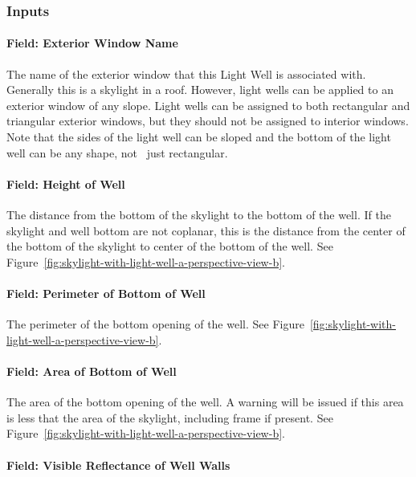 \subsubsection{Inputs}\label{inputs-8-004}

\paragraph{Field: Exterior Window Name}\label{field-exterior-window-name}

The name of the exterior window that this Light Well is associated with. Generally this is a skylight in a roof. However, light wells can be applied to an exterior window of any slope. Light wells can be assigned to both rectangular and triangular exterior windows, but they should not be assigned to interior windows. Note that the sides of the light well can be sloped and the bottom of the light well can be any shape, not~ just rectangular.

\paragraph{Field: Height of Well}\label{field-height-of-well}

The distance from the bottom of the skylight to the bottom of the well. If the skylight and well bottom are not coplanar, this is the distance from the center of the bottom of the skylight to center of the bottom of the well. See Figure~\ref{fig:skylight-with-light-well-a-perspective-view-b}.

\paragraph{Field: Perimeter of Bottom of Well}\label{field-perimeter-of-bottom-of-well}

The perimeter of the bottom opening of the well. See Figure~\ref{fig:skylight-with-light-well-a-perspective-view-b}.

\paragraph{Field: Area of Bottom of Well}\label{field-area-of-bottom-of-well}

The area of the bottom opening of the well. A warning will be issued if this area is less that the area of the skylight, including frame if present. See Figure~\ref{fig:skylight-with-light-well-a-perspective-view-b}.

\paragraph{Field: Visible Reflectance of Well Walls}\label{field-visible-reflectance-of-well-walls}

